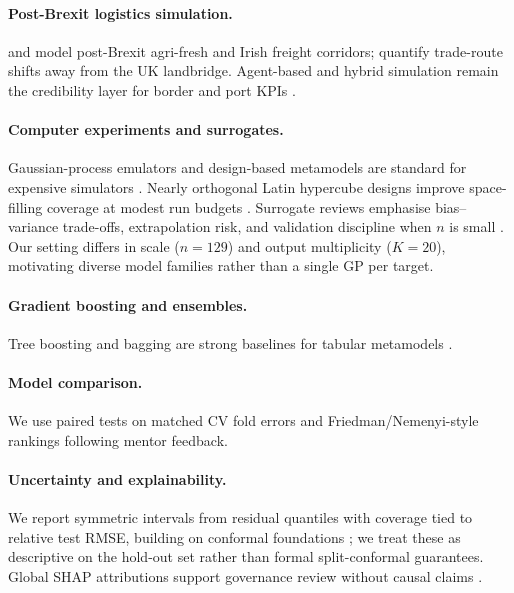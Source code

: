 \documentclass[10pt,twocolumn]{article}
\begin{document}
\paragraph{Post-Brexit logistics simulation.}
\citet{mahfouz2019} and \citet{mahfouz2020} model post-Brexit agri-fresh and Irish freight corridors; \citet{copenhagen2018} quantify trade-route shifts away from the UK landbridge.
Agent-based and hybrid simulation remain the credibility layer for border and port KPIs \citep{ivanov2025,byrne2009,amroune2019}.

\paragraph{Computer experiments and surrogates.}
Gaussian-process emulators and design-based metamodels are standard for expensive simulators \citep{santner2003design,forrester2008,kleijnen2015}.
Nearly orthogonal Latin hypercube designs improve space-filling coverage at modest run budgets \citep{cioppa2007,viana2016,bogoclu2021}.
Surrogate reviews emphasise bias--variance trade-offs, extrapolation risk, and validation discipline when $n$ is small \citep{razavi2012,simpson2001,bhosekar2018,wang2020surrogate,vabalas2019}.
Our setting differs in scale ($n{=}129$) and output multiplicity ($K{=}20$), motivating diverse model families rather than a single GP per target.

\paragraph{Gradient boosting and ensembles.}
Tree boosting and bagging are strong baselines for tabular metamodels \citep{friedman2001gbm,breiman2001random,bentejac2019,chen2016xgboost,ke2017lightgbm}.

\paragraph{Model comparison.}
We use paired tests on matched CV fold errors and Friedman/Nemenyi-style rankings \citep{demvsar2006statistical,nemenyi1963distribution,jia2025pairwise} following mentor feedback.

\paragraph{Uncertainty and explainability.}
We report symmetric intervals from residual quantiles with coverage tied to relative test RMSE, building on conformal foundations \citep{vovk2005algorithmic,angelopoulos2023conformal,romano2019cqr}; we treat these as descriptive on the hold-out set rather than formal split-conformal guarantees.
Global SHAP attributions support governance review without causal claims \citep{lundberg2017shap,salih2023shap}.
\end{document}
